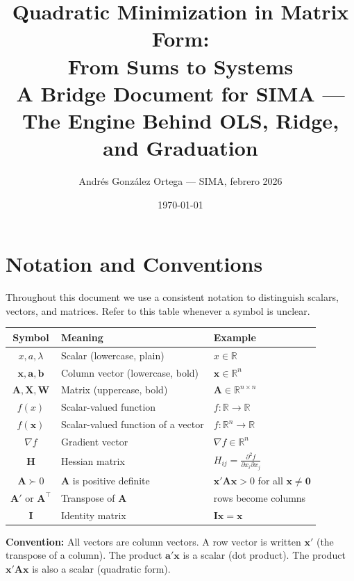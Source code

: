 \documentclass[11pt,a4paper]{article}
\title{\textbf{Quadratic Minimization in Matrix Form:\\From Sums to Systems}\\[0.5em]
\large A Bridge Document for SIMA --- The Engine Behind OLS, Ridge, and Graduation}
\author{Andr\'{e}s Gonz\'{a}lez Ortega --- SIMA, febrero 2026}
\date{\today}
\begin{document}
\maketitle

\tableofcontents
\newpage

\section{Notation and Conventions}

Throughout this document we use a consistent notation to distinguish scalars, vectors, and matrices. Refer to this table whenever a symbol is unclear.

\begin{center}
\renewcommand{\arraystretch}{1.4}
\begin{tabular}{c l l}
\toprule
\textbf{Symbol} & \textbf{Meaning} & \textbf{Example} \\
\midrule
$x, a, \lambda$ & Scalar (lowercase, plain) & $x \in \mathbb{R}$ \\
$\bm{x}, \bm{a}, \bm{b}$ & Column vector (lowercase, bold) & $\bm{x} \in \mathbb{R}^{n}$ \\
$\bm{A}, \bm{X}, \bm{W}$ & Matrix (uppercase, bold) & $\bm{A} \in \mathbb{R}^{n \times n}$ \\
$f(x)$ & Scalar-valued function & $f : \mathbb{R} \to \mathbb{R}$ \\
$f(\bm{x})$ & Scalar-valued function of a vector & $f : \mathbb{R}^n \to \mathbb{R}$ \\
$\nabla f$ & Gradient vector & $\nabla f \in \mathbb{R}^n$ \\
$\bm{H}$ & Hessian matrix & $H_{ij} = \frac{\partial^2 f}{\partial x_i \partial x_j}$ \\
$\bm{A} \succ 0$ & $\bm{A}$ is positive definite & $\bm{x}'\bm{A}\bm{x} > 0$ for all $\bm{x} \neq \bm{0}$ \\
$\bm{A}'$ or $\bm{A}^\top$ & Transpose of $\bm{A}$ & rows become columns \\
$\bm{I}$ & Identity matrix & $\bm{I}\bm{x} = \bm{x}$ \\
\bottomrule
\end{tabular}
\end{center}

\medskip
\noindent\textbf{Convention:} All vectors are column vectors. A row vector is written $\bm{x}'$ (the transpose of a column). The product $\bm{a}'\bm{x}$ is a scalar (dot product). The product $\bm{x}'\bm{A}\bm{x}$ is also a scalar (quadratic form).
\end{document}
